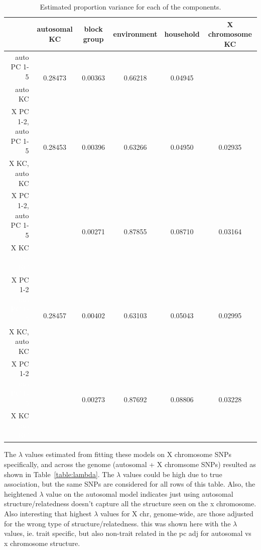 \documentclass[11pt]{article} %
\begin{document}
\begin{table}[h!]
\centering
\begin{tabular}{r|ccccc}
  \hline
 & autosomal KC & block group & environment & household & X chromosome KC  \\
  \hline
auto PC 1-5 &\multirow{2}{*}{0.28473} & \multirow{2}{*}{0.00363} & \multirow{2}{*}{0.66218} & \multirow{2}{*}{0.04945} & \\
auto KC & & \\  \hline
X PC 1-2, auto PC 1-5&\multirow{2}{*}{0.28453} & \multirow{2}{*}{0.00396} & \multirow{2}{*}{0.63266} & \multirow{2}{*}{0.04950} & \multirow{2}{*}{ 0.02935} \\ 
X KC, auto KC & & \\ \hline
X PC 1-2, auto PC 1-5 & \multirow{2}{*}{} & \multirow{2}{*}{0.00271} & \multirow{2}{*}{0.87855} & \multirow{2}{*}{0.08710} & \multirow{2}{*}{0.03164} \\
X KC \textcolor{white}{auto KC} & & \\ \hline
X PC 1-2 \textcolor{white}{auto PC 1-5}& \multirow{2}{*}{0.28457} & \multirow{2}{*}{0.00402}& \multirow{2}{*}{0.63103}& \multirow{2}{*}{0.05043}& \multirow{2}{*}{0.02995} \\
X KC, auto KC & & \\ \hline
X PC 1-2 \textcolor{white}{auto PC 1-5} & \multirow{2}{*}{} & \multirow{2}{*}{0.00273} & \multirow{2}{*}{0.87692}& \multirow{2}{*}{0.08806}& \multirow{2}{*}{0.03228}\\
X KC \textcolor{white}{auto KC} & & \\ \hline 
\end{tabular}
\caption{Estimated proportion variance for each of the components.}
\label{table:varComp}
\end{table}

The $\lambda$ values estimated from fitting these models on X chromosome SNPs specifically, and across the genome (autosomal + X chromsome SNPs) resulted as shown in Table~\ref{table:lambda}. 
The $\lambda$ values could be high due to true association, but the same SNPs are considered for all rows of this table. Also, the heightened $\lambda$ value on the autosomal model indicates just using autosomal structure/relatedness doesn't capture all the structure seen on the x chromosome.
Also interesting that highest $\lambda$ values for X chr, genome-wide, are those adjusted for the wrong type of structure/relatedness. this was shown here with the $\lambda$ values, ie. trait specific, but also non-trait related in the pc adj for autosomal vs x chromosome structure.
\end{document}

